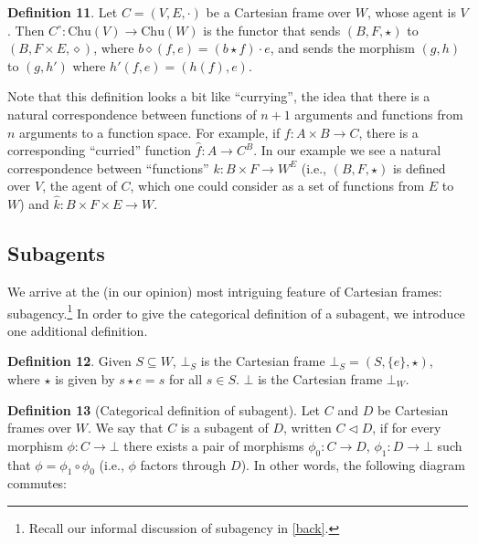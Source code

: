 \documentclass{article}
\begin{document}
\bigskip
\noindent \textbf{Definition 11}.
Let $C = (V, E, \cdot)$ be a Cartesian frame over $W$, whose agent is $V$.
Then $C^{\circ} : \text{Chu}(V) \to \text{Chu}(W)$ is the functor that sends $(B, F, \star)$ to $(B, F \times E, \diamond)$, where $b \diamond (f, e) = (b \star f) \cdot e$, and sends the morphism $(g, h)$ to $(g, h')$ where $h'(f, e) = (h(f), e)$.

\bigskip
\noindent Note that this definition looks a bit like ``currying'', the idea that there is a natural correspondence between functions of $n+1$ arguments and functions from $n$ arguments to a function space. For example, if $f: A \times B \to C$, there is a corresponding ``curried'' function $\hat{f} : A \to C^B$.
In our example we see a natural correspondence between ``functions'' $k: B \times F \to W^E$ (i.e., $(B, F, \star)$ is defined over $V$, the agent of $C$, which one could consider as a set of functions from $E$ to $W$) and $\hat{k} : B \times F \times E \to W$.


\subsection{Subagents}
\label{sub}

We arrive at the (in our opinion) most intriguing feature of Cartesian frames: subagency.\footnote{Recall our informal discussion of subagency in \cref{back}.} In order to give the categorical definition of a subagent, we introduce one additional definition. 

\bigskip
\noindent \textbf{Definition 12}.
Given $S \subseteq W$, $\bot_S$ is the Cartesian frame $\bot_S = (S, \{e\}, \star)$, where $\star$ is given by $s \star e = s$ for all $s \in S$.
$\bot$ is the Cartesian frame $\bot_W$.

\bigskip
\noindent \textbf{Definition 13} (Categorical definition of subagent).
Let $C$ and $D$ be Cartesian frames over $W$.
We say that $C$ is a subagent of $D$, written $C \triangleleft D$, if for every morphism $\phi : C \to \bot$ there exists a pair of morphisms $\phi_0 : C \to D$, $\phi_1 : D \to \bot$ such that $\phi = \phi_1 \circ \phi_0$ (i.e., $\phi$ factors through $D$).
In other words, the following diagram commutes:

\begin{center}
\end{center}
\end{document}

